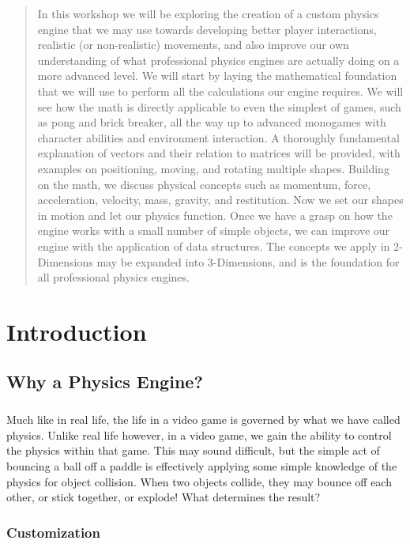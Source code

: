 \documentclass[12pt, letterpaper]{report}
\begin{document}
	\renewcommand{\abstractname}{Workshop Summary}
	\begin{abstract}
		In this workshop we will be exploring the creation of a custom physics engine that we may use towards developing better player interactions, realistic (or non-realistic) movements, and also improve our own understanding of what professional physics engines are actually doing on a more advanced level. We will start by laying the mathematical foundation that we will use to perform all the calculations our engine requires. We will see how the math is directly applicable to even the simplest of games, such as pong and brick breaker, all the way up to advanced monogames with character abilities and environment interaction. A thoroughly fundamental explanation of vectors and their relation to matrices will be provided, with examples on positioning, moving, and rotating multiple shapes. Building on the math, we discuss physical concepts such as momentum, force, acceleration, velocity, mass, gravity, and restitution. Now we set our shapes in motion and let our physics function. Once we have a grasp on how the engine works with a small number of simple objects, we can improve our engine with the application of data structures. The concepts we apply in 2-Dimensions may be expanded into 3-Dimensions, and is the foundation for all professional physics engines. 
	\end{abstract}

\tableofcontents

\renewcommand{\chaptername}{Introduction}
\chapter{Introduction}
	\section{Why a Physics Engine?}
	\paragraph{}Much like in real life, the life in a video game is governed by what we have called physics. Unlike real life however, in a video game, we gain the ability to control the physics within that game. This may sound difficult, but the simple act of bouncing a ball off a paddle is effectively applying some simple knowledge of the physics for object collision. When two objects collide, they may bounce off each other, or stick together, or explode! What determines the result? 
		\subsection{Customization}
\end{document}
